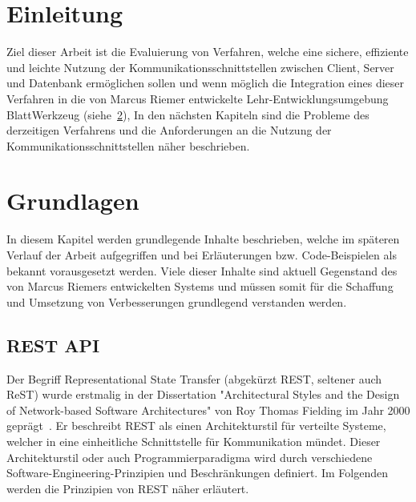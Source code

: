 
\chapter{Einleitung}
\label{sec:requirements}

Ziel dieser Arbeit ist die Evaluierung von Verfahren, welche eine sichere, effiziente und leichte Nutzung der Kommunikationsschnittstellen 
zwischen Client, Server und Datenbank ermöglichen sollen und wenn möglich die Integration eines dieser Verfahren
in die von Marcus Riemer entwickelte Lehr-Entwicklungsumgebung BlattWerkzeug (siehe~\ref{sec:basics}),
In den nächsten Kapiteln sind die Probleme des derzeitigen Verfahrens und die Anforderungen an die Nutzung der Kommunikationsschnittstellen näher beschrieben.

\chapter{Grundlagen}
\label{sec:basics}
In diesem Kapitel werden grundlegende Inhalte beschrieben, welche im späteren Verlauf der Arbeit aufgegriffen 
und bei Erläuterungen bzw. Code-Beispielen als bekannt vorausgesetzt werden. Viele dieser Inhalte sind aktuell Gegenstand
des von Marcus Riemers entwickelten Systems und müssen somit für die Schaffung und Umsetzung von Verbesserungen grundlegend verstanden werden.
\section{REST API}
\label{sec:basics:restapi}
Der Begriff Representational State Transfer (abgekürzt REST, seltener auch ReST) wurde erstmalig in der Dissertation "Architectural Styles and the Design of
Network-based Software Architectures" von Roy Thomas Fielding im Jahr 2000 geprägt~\cite{fielding-dissertation}.
Er beschreibt REST als einen Architekturstil für verteilte Systeme, welcher in eine einheitliche Schnittstelle für Kommunikation mündet.
Dieser Architekturstil oder auch Programmierparadigma wird durch verschiedene Software-Engineering-Prinzipien und Beschränkungen definiert.
Im Folgenden werden die Prinzipien von REST näher erläutert.

